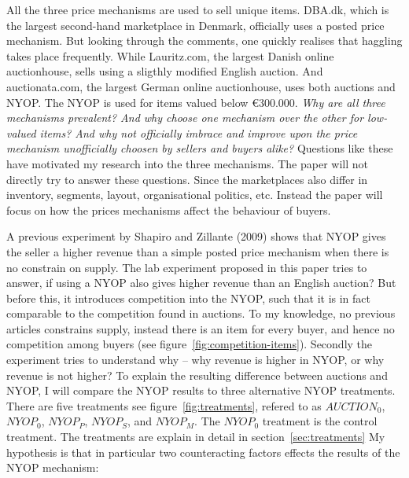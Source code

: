 \documentclass[a4paper,12pt]{article}
\begin{document}
	All the three price mechanisms are used to sell unique items. DBA.dk, which is the largest second-hand marketplace in Denmark, officially uses a posted price mechanism. But looking through the comments, one quickly realises that haggling takes place frequently. While Lauritz.com, the largest Danish online auctionhouse, sells using a sligthly modified English auction. And auctionata.com, the largest German online auctionhouse, uses both auctions and NYOP. The NYOP is used for items valued below \euro300.000. \emph{Why are all three mechanisms prevalent? And why choose one mechanism over the other for low-valued items? And why not officially imbrace and improve upon the price mechanism unofficially choosen by sellers and buyers alike?} Questions like these have motivated my research into the three mechanisms. The paper will not directly try to answer these questions. Since the marketplaces also differ in inventory, segments, layout, organisational politics, etc. Instead the paper will focus on how the prices mechanisms affect the behaviour of buyers.
	
	A previous experiment by Shapiro and Zillante (2009) shows that NYOP gives the seller a higher revenue than a simple posted price mechanism when there is no constrain on supply. The lab experiment proposed in this paper tries to answer, if using a NYOP also gives higher revenue than an English auction? But before this, it introduces competition into the NYOP, such that it is in fact comparable to the competition found in auctions. To my knowledge, no previous articles constrains supply, instead there is an item for every buyer, and hence no competition among buyers (see figure~\ref{fig:competition-items}). Secondly the experiment tries to understand why -- why revenue is higher in NYOP, or why revenue is not higher? To explain the resulting difference between auctions and NYOP, I will compare the NYOP results to three alternative NYOP treatments. There are five treatments see figure~\ref{fig:treatments}, refered to as $AUCTION_0$, $NYOP_0$, $NYOP_P$, $NYOP_S$, and $NYOP_M$. The $NYOP_0$ treatment is the control treatment. The treatments are explain in detail in section~\ref{sec:treatments} My hypothesis is that in particular two counteracting factors effects the results of the NYOP mechanism:
\end{document}
